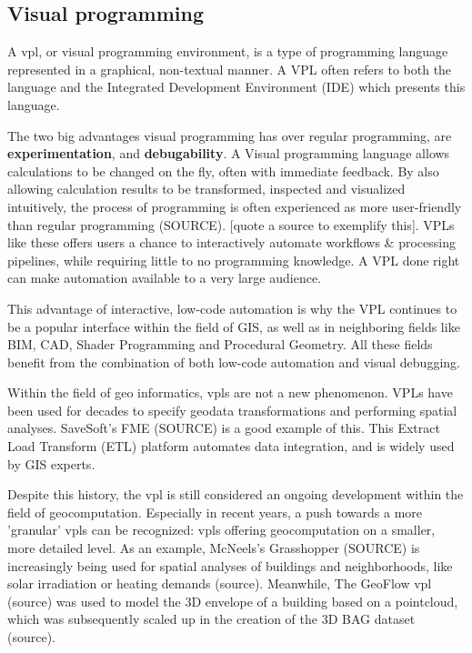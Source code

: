 \subsection*{Visual programming}


A \ac{vpl}, or visual programming environment, is a type of programming language represented in a graphical, non-textual manner.
A VPL often refers to both the language and the Integrated Development Environment (IDE) which presents this language.

The two big advantages visual programming has over regular programming, are \textbf{experimentation}, and \textbf{debugability}.
A Visual programming language allows calculations to be changed on the fly, often with immediate feedback. By also allowing calculation results to be transformed, inspected and visualized intuitively, the process of programming is often experienced as more user-friendly than regular programming (SOURCE).
[quote a source to exemplify this].
VPLs like these offers users a chance to interactively automate workflows \& processing pipelines, while requiring little to no programming knowledge. 
A VPL done right can make automation available to a very large audience.

This advantage of interactive, low-code automation is why the VPL continues to be a popular interface within the field of GIS, as well as in neighboring fields like BIM, CAD, Shader Programming and Procedural Geometry. 
All these fields benefit from the combination of both low-code automation and visual debugging.

Within the field of geo informatics, \ac{vpl}s are not a new phenomenon. VPLs have been used for decades to specify geodata transformations and performing spatial analyses.  
SaveSoft's FME (SOURCE) is a good example of this. This Extract Load Transform (ETL) platform automates data integration, and is widely used by GIS experts.


Despite this history, the \ac{vpl} is still considered an ongoing development within the field of geocomputation. 
Especially in recent years, a push towards a more 'granular' \ac{vpl}s can be recognized: 
\ac{vpl}s offering geocomputation on a smaller, more detailed level. 
As an example, McNeels's Grasshopper (SOURCE) is increasingly being used for spatial analyses of buildings and neighborhoods, like solar irradiation or heating demands (source). 
Meanwhile, The GeoFlow \ac{vpl} (source) was used to model the 3D envelope of a building based on a pointcloud, which was subsequently scaled up in the creation of the 3D BAG dataset (source).

